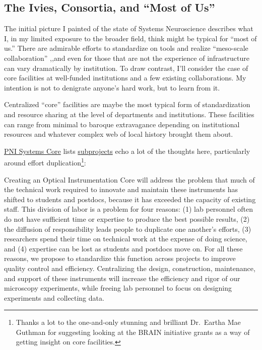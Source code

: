 \documentclass{article}
\begin{document}
\hypertarget{the-ivies-consortia-and-most-of-us}{%
\subsection{The Ivies, Consortia, and ``Most of
Us''}\label{the-ivies-consortia-and-most-of-us}}

The initial picture I painted of the state of Systems Neuroscience
describes what I, in my limited exposure to the broader field, think
might be typical for ``most of us.'' There are admirable efforts to
standardize on tools and realize ``meso-scale collaboration'' \cite{mainenBetterWayCrack2016},,and even for those that are not the
experience of infrastructure can vary dramatically by institution. To
draw contrast, I'll consider the case of core facilities at well-funded
institutions and a few existing collaborations. My intention is not to
denigrate anyone's hard work, but to learn from it.

Centralized ``core'' facilities are maybe the most typical form of
standardization and resource sharing at the level of departments and
institutions. These facilities can range from minimal to baroque
extravagance depending on institutional resources and whatever complex
web of local history brought them about.

\href{https://projectreporter.nih.gov/project_info_details.cfm?aid=9444124}{PNI
Systems Core} lists
\href{https://projectreporter.nih.gov/project_info_subprojects.cfm?aid=9444124\&icde=0}{subprojects}
echo a lot of the thoughts here, particularly around effort
duplication\footnote{Thanks a lot to the one-and-only stunning and
  brilliant Dr.~Eartha Mae Guthman for suggesting looking at the BRAIN
  initiative grants as a way of getting insight on core facilities.}:

\begin{leftbar}
Creating an Optical Instrumentation Core will address the problem that
much of the technical work required to innovate and maintain these
instruments has shifted to students and postdocs, because it has
exceeded the capacity of existing staff. This division of labor is a
problem for four reasons: (1) lab personnel often do not have sufficient
time or expertise to produce the best possible results, (2) the
diffusion of responsibility leads people to duplicate one another's
efforts, (3) researchers spend their time on technical work at the
expense of doing science, and (4) expertise can be lost as students and
postdocs move on. For all these reasons, we propose to standardize this
function across projects to improve quality control and efficiency.
Centralizing the design, construction, maintenance, and support of these
instruments will increase the efficiency and rigor of our microscopy
experiments, while freeing lab personnel to focus on designing
experiments and collecting data.
\end{leftbar}
\end{document}
